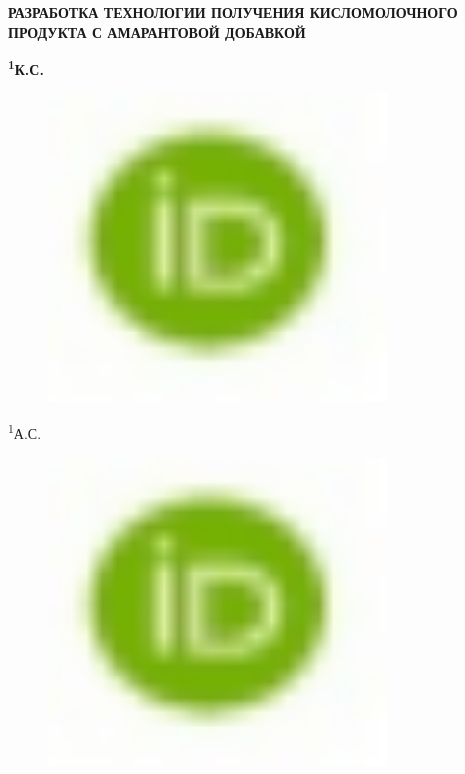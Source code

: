 
{\bfseries РАЗРАБОТКА ТЕХНОЛОГИИ ПОЛУЧЕНИЯ КИСЛОМОЛОЧНОГО ПРОДУКТА С
АМАРАНТОВОЙ ДОБАВКОЙ}

{\bfseries \textsuperscript{1}К.С.
\begin{figure}[H]
	\centering
	\includegraphics[width=0.8\textwidth]{media/pish2/image2}
	\caption*{}
\end{figure}

\textsuperscript{1}А.С.
\begin{figure}[H]
	\centering
	\includegraphics[width=0.8\textwidth]{media/pish2/image2}
	\caption*{}
\end{figure}

}
